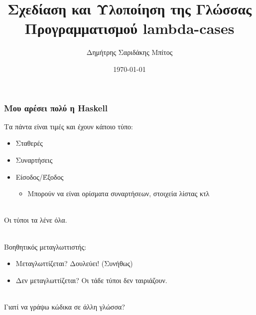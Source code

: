 \documentclass{beamer}
\date{\today}
\author{Δημήτρης Σαριδάκης Μπίτος}
\institute{
Σχολή Ηλεκτρολόγων Μηχανικών και Μηχανικών Υπολογιστών
\\
Εθνικό Μετσόβιο Πολυτεχνείο
}
\def\e{\foreignlanguage{english}}
\def\h{\e{Haskell}}
\begin{document}
\title{Σχεδίαση και Υλοποίηση της Γλώσσας Προγραμματισμού \e{lambda-cases}}
\frame{\titlepage}

\begin{frame}

\frametitle{Μου αρέσει πολύ η \h}

Τα πάντα είναι τιμές και έχουν κάποιο τύπο:

\begin{itemize}

\item Σταθερές
\item Συναρτήσεις
\item Είσοδος/Έξοδος

\begin{itemize}

\item Μπορούν να είναι ορίσματα συναρτήσεων, στοιχεία λίστας κτλ
\\~\
\end{itemize}

\end{itemize}

\pause
Οι τύποι τα λένε όλα.
\\~\

\pause
Βοηθητικός μεταγλωττιστής:

\begin{itemize}

\item Μεταγλωττίζεται? Δουλεύει! (Συνήθως)

\item Δεν μεταγλωττίζεται? Οι τάδε τύποι δεν ταιριάζουν.
\\~\

\end{itemize}

\pause
Γιατί να γράψω κώδικα σε άλλη γλώσσα?

\end{frame}
\end{document}
